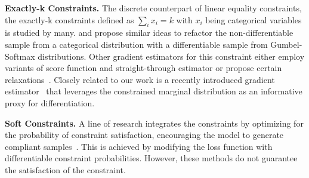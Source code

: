 \textbf{Exactly-k Constraints.}
The discrete counterpart of linear equality constraints, 
the exactly-k constraints defined as $\sum_i x_i = k$ with $x_i$ being categorical variables is studied by many.
\citet{maddison2016concrete} and \citet{jang2016categorical} propose similar ideas to refactor the non-differentiable sample from a categorical distribution with a differentiable sample from Gumbel-Softmax distributions. 
Other gradient estimators for this constraint
either employ variants of score function and straight-through estimator or propose certain relaxations~\citep{kim2016exact,chen2018learning,grover2019stochastic,Sang2019reparameterizable}. 
Closely related to our work is
a recently introduced gradient estimator~\citep{ahmed2022simple} that leverages the
constrained marginal distribution as an informative proxy for differentiation.




\textbf{Soft Constraints.}
A line of research integrates the constraints by optimizing for the probability of constraint satisfaction, encouraging the model to generate compliant samples~\citep{diligenti2012bridging,xu2018semantic,fischer2019dl2,badreddine2022logic,stoian2024exploiting,shukla2024unified}.
This is achieved by modifying the loss function with differentiable constraint probabilities.
However, these methods do not guarantee the satisfaction of the constraint.